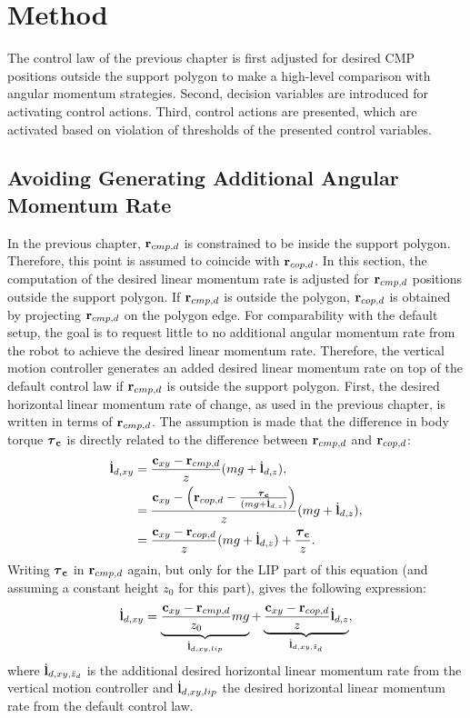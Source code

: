 \section{Method}
The control law of the previous chapter is first adjusted for desired \ac{CMP} positions outside the support polygon to make a high-level comparison with angular momentum strategies. Second, decision variables are introduced for activating control actions. Third, control actions are presented, which are activated based on violation of thresholds of the presented control variables.

\subsection{Avoiding Generating Additional Angular Momentum Rate}
In the previous chapter, $\mathbf{r}_{cmp,d}$ is constrained to be inside the support polygon. Therefore, this point is assumed to coincide with $\mathbf{r}_{cop,d}$. In this section, the computation of the desired linear momentum rate is adjusted for $\mathbf{r}_{cmp,d}$ positions outside the support polygon. If $\mathbf{r}_{cmp,d}$ is outside the polygon, $\mathbf{r}_{cop,d}$ is obtained by projecting $\mathbf{r}_{cmp,d}$ on the polygon edge. For comparability with the default setup, the goal is to request little to no additional angular momentum rate from the robot to achieve the desired linear momentum rate. Therefore, the vertical motion controller generates an added desired linear momentum rate on top of the default control law if $\mathbf{r}_{cmp,d}$ is outside the support polygon. First, the desired horizontal linear momentum rate of change, as used in the previous chapter, is written in terms of $\mathbf{r}_{cmp,d}$. The assumption is made that the difference in body torque $\boldsymbol{\tau}_{\mathbf{c}}$ is directly related to the difference between $\mathbf{r}_{cmp,d}$ and $\mathbf{r}_{cop,d}$:
\begin{align}
    \dot{\mathbf{l}}_{d,xy} &= \frac{\mathbf{c}_{xy}-\mathbf{r}_{cmp,d}}{z}(mg+\dot{\mathbf{l}}_{d,z}),\\
&=\frac{\mathbf{c}_{xy}-\Big(\mathbf{r}_{cop,d}-\frac{\boldsymbol{\tau}_{\mathbf{c}}}{(mg+\dot{\mathbf{l}}_{d,z})}\Big)}{z}(mg+\dot{\mathbf{l}}_{d,z}), \\
&=\frac{\mathbf{c}_{xy}-\mathbf{r}_{cop,d}}{z}(mg + \dot{\mathbf{l}}_{d,z})+ \frac{\boldsymbol{\tau}_{\mathbf{c}}}{z}.
\end{align}
Writing $\boldsymbol{\tau}_{\mathbf{c}}$ in $\mathbf{r}_{cmp,d}$ again, but only for the \ac{LIP} part of this equation (and assuming a constant height $z_0$ for this part), gives the following expression:
 \begin{equation}
\dot{\mathbf{l}}_{d,xy} = \underbrace{ \frac{\mathbf{c}_{xy}-\mathbf{r}_{cmp,d}} {z_0}mg}_{\dot{\mathbf{l}}_{d,xy,lip}}  + \underbrace{\frac{\mathbf{c}_{xy}-\mathbf{r}_{cop,d}}{z}\dot{\mathbf{l}}_{d,z}}_{\dot{\mathbf{l}}_{d,xy,\ddot{z}_d}},
\end{equation}
where $\dot{\mathbf{l}}_{d,xy,\ddot{z}_d}$ is the additional desired horizontal linear momentum rate from the vertical motion controller and $\dot{\mathbf{l}}_{d,xy,lip}$ the desired horizontal linear momentum rate from the default control law.

